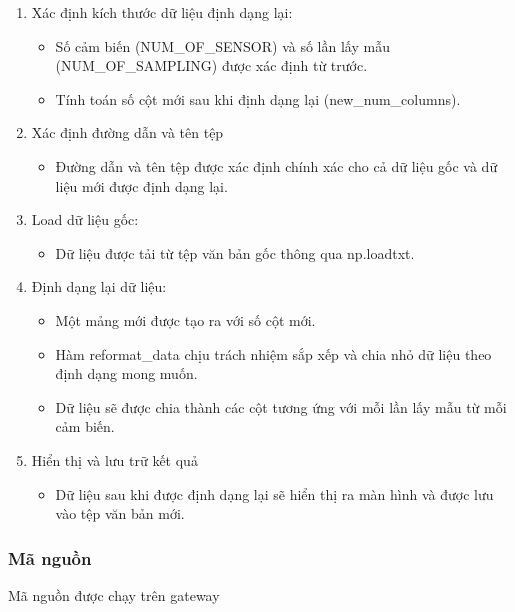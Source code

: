 \begin{enumerate}[-]
    \item Xác định kích thước dữ liệu định dạng lại:
    \begin{itemize}
        \item Số cảm biến (NUM\_OF\_SENSOR) và số lần lấy mẫu (NUM\_OF\_SAMPLING) được xác định từ trước.
        \item Tính toán số cột mới sau khi định dạng lại (new\_num\_columns).
    \end{itemize}
    \item  Xác định đường dẫn và tên tệp
    \begin{itemize}
        \item Đường dẫn và tên tệp được xác định chính xác cho cả dữ liệu gốc và dữ liệu mới được định dạng lại.
    \end{itemize}
    \item  Load dữ liệu gốc:
    \begin{itemize}
        \item Dữ liệu được tải từ tệp văn bản gốc thông qua np.loadtxt.
    \end{itemize}
    \item  Định dạng lại dữ liệu:
    \begin{itemize}
        \item Một mảng mới được tạo ra với số cột mới.
        \item Hàm reformat\_data chịu trách nhiệm sắp xếp và chia nhỏ dữ liệu theo định dạng mong muốn.
        \item Dữ liệu sẽ được chia thành các cột tương ứng với mỗi lần lấy mẫu từ mỗi cảm biến.
    \end{itemize}
    \item  Hiển thị và lưu trữ kết quả
    \begin{itemize}
        \item Dữ liệu sau khi được định dạng lại sẽ hiển thị ra màn hình và được lưu vào tệp văn bản mới.
    \end{itemize}
\end{enumerate}

\subsubsection{Mã nguồn}

\indent Mã nguồn được chạy trên gateway

